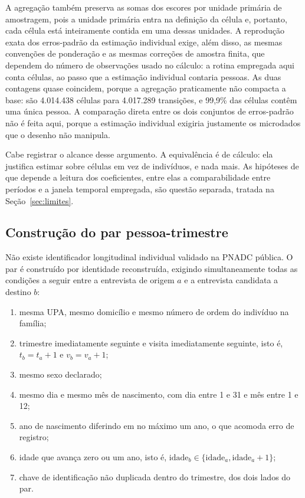 A agregação também preserva as somas dos escores por unidade primária de
amostragem, pois a unidade primária entra na definição da célula e, portanto,
cada célula está inteiramente contida em uma dessas unidades. A reprodução exata
dos erros-padrão da estimação individual exige, além disso, as mesmas convenções
de ponderação e as mesmas correções de amostra finita, que dependem do número de
observações usado no cálculo: a rotina empregada aqui conta células, ao passo
que a estimação individual contaria pessoas. As duas contagens quase coincidem,
porque a agregação praticamente não compacta a base: são 4.014.438 células para
4.017.289 transições, e 99,9\% das células contêm uma única pessoa. A comparação
direta entre os dois conjuntos de erros-padrão não é feita aqui, porque a
estimação individual exigiria justamente os microdados que o desenho não
manipula.

Cabe registrar o alcance desse argumento. A equivalência é de cálculo: ela
justifica estimar sobre células em vez de indivíduos, e nada mais. As hipóteses
de que depende a leitura dos coeficientes, entre elas a comparabilidade entre
períodos e a janela temporal empregada, são questão separada, tratada na
Seção~\ref{sec:limites}.

\subsection{Construção do par pessoa-trimestre}
\label{sec:par}

Não existe identificador longitudinal individual validado na PNADC pública. O
par é construído por identidade reconstruída, exigindo simultaneamente todas as
condições a seguir entre a entrevista de origem $a$ e a entrevista candidata a
destino $b$:

\begin{enumerate}[label=\alph*)]
  \item mesma UPA, mesmo domicílio e mesmo número de ordem do indivíduo na
        família;
  \item trimestre imediatamente seguinte e visita imediatamente seguinte, isto
        é, $t_b = t_a + 1$ e $v_b = v_a + 1$;
  \item mesmo sexo declarado;
  \item mesmo dia e mesmo mês de nascimento, com dia entre 1 e 31 e mês entre 1
        e 12;
  \item ano de nascimento diferindo em no máximo um ano, o que acomoda erro de registro;
  \item idade que avança zero ou um ano, isto é, $\text{idade}_b \in
        \{\text{idade}_a, \text{idade}_a + 1\}$;
  \item chave de identificação não duplicada dentro do trimestre, dos dois
        lados do par.
\end{enumerate}

